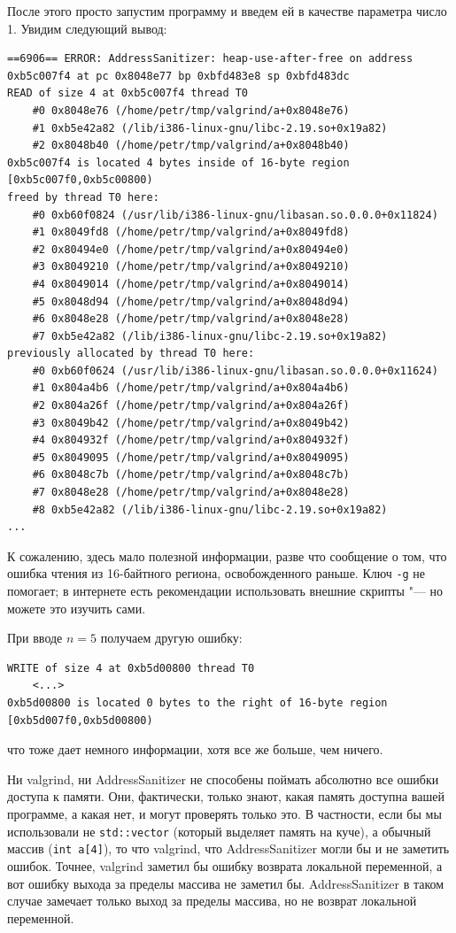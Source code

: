\documentclass[a4paper,10pt]{problems}
\begin{document}
После этого просто запустим программу и введем ей в качестве параметра число 1. Увидим следующий вывод:
\begin{verbatim}
==6906== ERROR: AddressSanitizer: heap-use-after-free on address 0xb5c007f4 at pc 0x8048e77 bp 0xbfd483e8 sp 0xbfd483dc
READ of size 4 at 0xb5c007f4 thread T0
    #0 0x8048e76 (/home/petr/tmp/valgrind/a+0x8048e76)
    #1 0xb5e42a82 (/lib/i386-linux-gnu/libc-2.19.so+0x19a82)
    #2 0x8048b40 (/home/petr/tmp/valgrind/a+0x8048b40)
0xb5c007f4 is located 4 bytes inside of 16-byte region [0xb5c007f0,0xb5c00800)
freed by thread T0 here:
    #0 0xb60f0824 (/usr/lib/i386-linux-gnu/libasan.so.0.0.0+0x11824)
    #1 0x8049fd8 (/home/petr/tmp/valgrind/a+0x8049fd8)
    #2 0x80494e0 (/home/petr/tmp/valgrind/a+0x80494e0)
    #3 0x8049210 (/home/petr/tmp/valgrind/a+0x8049210)
    #4 0x8049014 (/home/petr/tmp/valgrind/a+0x8049014)
    #5 0x8048d94 (/home/petr/tmp/valgrind/a+0x8048d94)
    #6 0x8048e28 (/home/petr/tmp/valgrind/a+0x8048e28)
    #7 0xb5e42a82 (/lib/i386-linux-gnu/libc-2.19.so+0x19a82)
previously allocated by thread T0 here:
    #0 0xb60f0624 (/usr/lib/i386-linux-gnu/libasan.so.0.0.0+0x11624)
    #1 0x804a4b6 (/home/petr/tmp/valgrind/a+0x804a4b6)
    #2 0x804a26f (/home/petr/tmp/valgrind/a+0x804a26f)
    #3 0x8049b42 (/home/petr/tmp/valgrind/a+0x8049b42)
    #4 0x804932f (/home/petr/tmp/valgrind/a+0x804932f)
    #5 0x8049095 (/home/petr/tmp/valgrind/a+0x8049095)
    #6 0x8048c7b (/home/petr/tmp/valgrind/a+0x8048c7b)
    #7 0x8048e28 (/home/petr/tmp/valgrind/a+0x8048e28)
    #8 0xb5e42a82 (/lib/i386-linux-gnu/libc-2.19.so+0x19a82)
...
\end{verbatim}
К сожалению, здесь мало полезной информации, разве что сообщение о том, что ошибка чтения из 16-байтного региона, освобожденного раньше.
Ключ \verb`-g` не помогает; в интернете есть рекомендации использовать внешние скрипты "--- но можете это изучить сами.

При вводе $n=5$ получаем другую ошибку:
\begin{verbatim}
WRITE of size 4 at 0xb5d00800 thread T0
    <...>
0xb5d00800 is located 0 bytes to the right of 16-byte region [0xb5d007f0,0xb5d00800)
\end{verbatim}
что тоже дает немного информации, хотя все же больше, чем ничего.

Ни valgrind, ни AddressSanitizer не способены поймать абсолютно все ошибки доступа к памяти. 
Они, фактически, только знают, какая память доступна вашей программе, а какая нет, и могут проверять только это.
В частности, если бы мы использовали не \verb`std::vector` (который выделяет память на куче), а обычный массив (\verb`int a[4]`), 
то что valgrind, что AddressSanitizer могли бы и не заметить ошибок. 
Точнее, valgrind заметил бы ошибку возврата локальной переменной, а вот ошибку выхода за пределы массива не заметил бы.
AddressSanitizer в таком случае замечает только выход за пределы массива, но не возврат локальной переменной.
\end{document}
